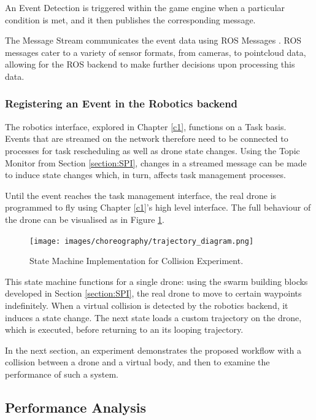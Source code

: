 An Event Detection is triggered within the game engine when a particular condition is met, and it then publishes the corresponding message.

The Message Stream communicates the event data using ROS Messages \cite{ros_docs}. ROS messages cater to a variety of sensor formats, from cameras, to pointcloud data, allowing for the ROS backend to make further decisions upon processing this data.

\subsubsection{Registering an Event in the Robotics backend}

The robotics interface, explored in Chapter \ref{c1}, functions on a Task basis. Events that are streamed on the network therefore need to be connected to processes for task rescheduling as well as drone state changes. Using the Topic Monitor from Section \ref{section:SPI}, changes in a streamed message can be made to induce state changes which, in turn, affects task management processes.

Until the event reaches the task management interface, the real drone is programmed to fly using  Chapter \ref{c1}'s high level interface. The full behaviour of the drone can be visualised as in Figure \ref{collision:sm_design}. 

\begin{figure}[!h]
    \raggedright
    \hspace{2cm}\texttt{[image: images/choreography/trajectory\_diagram.png]}
    \caption{State Machine Implementation for Collision Experiment.}
    \label{collision:sm_design}
\end{figure}


This state machine functions for a single drone: using the swarm building blocks developed in Section \ref{section:SPI}, the real drone to move to certain waypoints indefinitely. When a virtual collision is detected by the robotics backend, it induces a state change. The next state loads a custom trajectory on the drone, which is executed, before returning to an its looping trajectory. %

In the next section, an experiment demonstrates the proposed workflow with a collision between a drone and a virtual body, and then to examine the performance of such a system. 
\pagebreak
\subsection{Performance Analysis}\label{section:collisions} 

